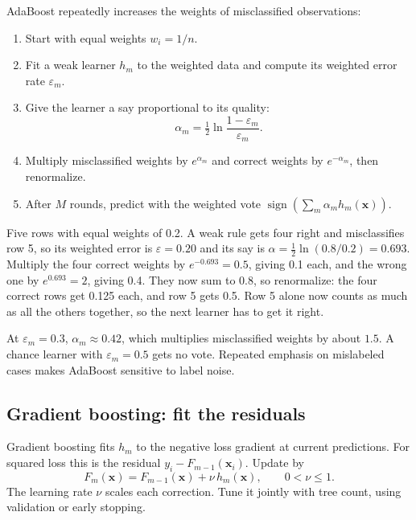AdaBoost repeatedly increases the weights of misclassified observations:

\begin{enumerate}
  \item Start with equal weights $w_i=1/n$.
  \item Fit a weak learner $h_m$ to the weighted data and compute its weighted error rate $\varepsilon_m$.
  \item Give the learner a say proportional to its quality:
  \[
    \alpha_m=\tfrac{1}{2}\ln\frac{1-\varepsilon_m}{\varepsilon_m}.
  \]
  \item Multiply misclassified weights by $e^{\alpha_m}$ and correct weights by $e^{-\alpha_m}$, then renormalize.
  \item After $M$ rounds, predict with the weighted vote $\operatorname{sign}\!\left(\sum_m\alpha_m h_m(\bm{x})\right)$.
\end{enumerate}

\begin{workedexample}
Five rows with equal weights of 0.2. A weak rule gets four right and misclassifies row 5, so its weighted error is $\varepsilon=0.20$ and its say is $\alpha=\tfrac12\ln(0.8/0.2)=0.693$. Multiply the four correct weights by $e^{-0.693}=0.5$, giving 0.1 each, and the wrong one by $e^{0.693}=2$, giving 0.4. They now sum to 0.8, so renormalize: the four correct rows get 0.125 each, and row 5 gets 0.5. Row 5 alone now counts as much as all the others together, so the next learner has to get it right.
\end{workedexample}

At $\varepsilon_m=0.3$, $\alpha_m\approx0.42$, which multiplies misclassified weights by about $1.5$. A chance learner with $\varepsilon_m=0.5$ gets no vote. Repeated emphasis on mislabeled cases makes AdaBoost sensitive to label noise.

\subsection{Gradient boosting: fit the residuals}
\label{sec:gradient-boosting}

Gradient boosting fits $h_m$ to the negative loss gradient at current predictions. For squared loss this is the residual $y_i-F_{m-1}(\bm x_i)$. Update by
\[
  F_m(\bm{x})
  =F_{m-1}(\bm{x})+\nu\,h_m(\bm{x}),
  \qquad 0<\nu\leq 1.
\]
The learning rate $\nu$ scales each correction. Tune it jointly with tree count, using validation or early stopping.

